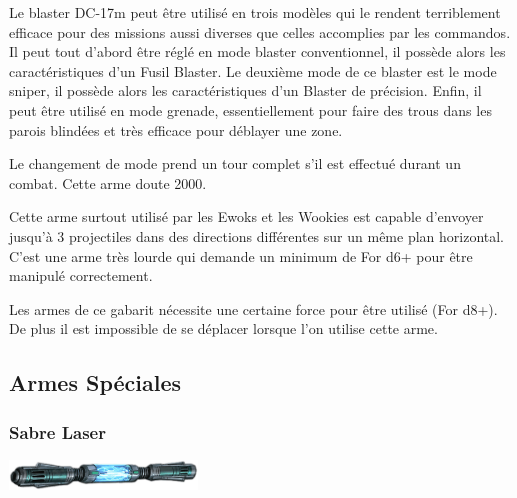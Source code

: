 \begin{description}[align=left]
    \item [Fusil Blaster DC-17m]
        Le blaster DC-17m peut être utilisé en trois modèles qui le rendent terriblement efficace pour des missions aussi diverses que celles accomplies par les commandos. Il peut tout d’abord être réglé en mode blaster conventionnel, il possède alors les caractéristiques d’un Fusil Blaster. Le deuxième mode de ce blaster est le mode sniper, il possède alors les caractéristiques d’un Blaster de précision. Enfin, il peut être utilisé en mode grenade, essentiellement pour faire des trous dans les parois blindées et très efficace pour déblayer une zone.

        Le changement de mode prend un tour complet s’il est effectué durant un combat. Cette arme doute 2000\crg.

    \item [Arbalète Laser]
        Cette arme surtout utilisé par les Ewoks et les Wookies est capable d’envoyer jusqu’à 3 projectiles dans des directions différentes sur un même plan horizontal. C’est une arme très lourde qui demande un minimum de For d6+ pour être manipulé correctement.

    \item [Canon blaster rotatif]
        Les armes de ce gabarit nécessite une certaine force pour être utilisé (For d8+). De plus il est impossible de se déplacer lorsque l’on utilise cette arme.
\end{description}


\clearpage
\subsection{Armes Spéciales}

\subsubsection{Sabre Laser}
\label{sec:sabre-laser}

\begin{flushright}
	\vspace{-5\baselineskip}
	\includegraphics[width=5cm, angle=-25]{img/equipement/lightsaber01.png}
	\vspace{-1\baselineskip}
\end{flushright}

